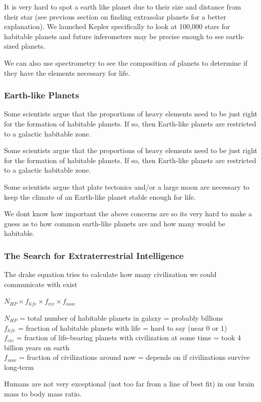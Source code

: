 \documentclass[12pt]{article}
\begin{document}
It is very hard to spot a earth like planet due to their size and distance from their star (see previous section on finding extrasolar planets for a better explanation). We launched Kepler specifically to look at 100,000 stars for habitable planets and future inferometers may be precise enough to see earth-sized planets.

We can also use spectrometry to see the composition of planets to determine if they have the elements necessary for life.

\subsubsection{Earth-like Planets}
Some scientists argue that the proportions of heavy elements need to be just right for the formation of habitable planets. If so, then Earth-like planets are restricted to a galactic habitable zone.

Some scientists argue that the proportions of heavy elements need to be just right for the formation of habitable planets. If so, then Earth-like planets are restricted to a galactic habitable zone.

Some scientists argue that plate tectonics and/or a large moon are necessary to keep the climate of an Earth-like planet stable enough for life.

We dont know how important the above concerns are so its very hard to make a guess as to how common earth-like planets are and how many would be habitable.

\subsubsection{The Search for Extraterrestrial Intelligence}
The drake equation tries to calculate how many civilization we could communicate with exist
\begin{center}
    $N_{HP} \times f_{life} \times f_{civ} \times f_{now}$
\end{center}
$N_{HP}$ = total number of habitable planets in galaxy = probably billions\\
$f_{life}$ = fraction of habitable planets with life = hard to say (near 0 or 1)\\
$f_{civ}$ = fraction of life-bearing planets with civilization at some time = took 4 billion years on earth \\
$f_{now}$ = fraction of civilizations around now = depends on if civilizations survive long-term

Humans are not very exceptional (not too far from a line of best fit) in our brain mass to body mass ratio.
\end{document}
